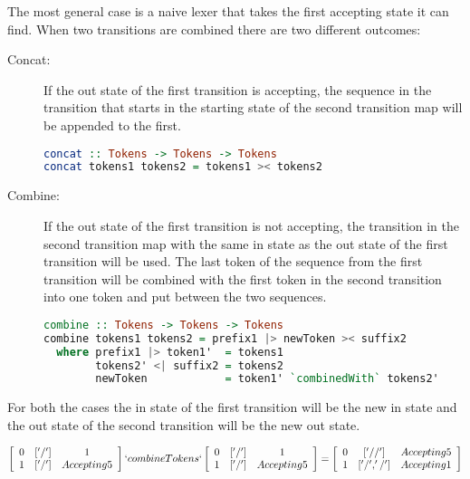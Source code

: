 The most general case is a naive lexer that takes the first accepting state it
can find. When two transitions are combined there are two different outcomes:
\begin{description} 
  \item[Concat:]If the out state of the first transition is accepting, the
    sequence in the transition that starts in the starting state of the second
    transition map will be appended to the first.
\begin{lstlisting}[language=Haskell, mathescape=true]
concat :: Tokens -> Tokens -> Tokens 
concat tokens1 tokens2 = tokens1 >< tokens2
\end{lstlisting}

  \item[Combine:]If the out state of the first transition is not accepting, the
    transition in the second transition map with the same in state as the out
    state of the first transition will be used. The last token of the sequence
    from the first transition will be combined with the first token in the second
    transition into one token and put between the two sequences.\\

\begin{lstlisting}[language=Haskell, mathescape=true]
combine :: Tokens -> Tokens -> Tokens 
combine tokens1 tokens2 = prefix1 |> newToken >< suffix2
  where prefix1 |> token1'  = tokens1
        tokens2' <| suffix2 = tokens2
        newToken            = token1' `combinedWith` tokens2'
\end{lstlisting}

\end{description}
For both the cases the in state of the first transition will be the new in state
and the out state of the second transition will be the new out state.
\begin{center}
$\left[\begin{array}{ccc}
0&['/']&1\\
1&['/']&Accepting 5\\
\end{array}\right] `combineTokens`
\left[\begin{array}{ccc}
0&['/']&1\\
1&['/']&Accepting 5\\
\end{array}\right] =
\left[\begin{array}{ccc}
0&['//']&Accepting 5\\
1&['/','/']&Accepting 1\\
\end{array}\right]$
\end{center}
